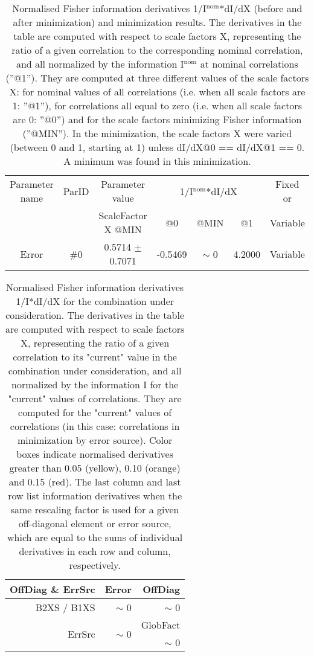 \begin{table}[H]
\scriptsize
\begin{center}
\renewcommand{\arraystretch}{1.1}
\begin{tabular}{|c|c|c|ccc|c|}
\hline
Parameter name & ParID & Parameter value &\multicolumn{3}{|c|}{1/I$^\mathrm{nom}$*dI/dX} & Fixed or\\
 & & ScaleFactor X @MIN & @0 & @MIN & @1 & Variable\\
\hline
 {\tiny Error} & \#0 &    0.5714 $\pm$    0.7071 &   -0.5469 & {\tiny $\sim$ }0 &    4.2000 & Variable \\
\hline
\end{tabular}
\renewcommand{\arraystretch}{1}
\caption{Normalised Fisher information derivatives 1/I$^\mathrm{nom}$*dI/dX (before and after minimization) and minimization results.  The derivatives in the table are computed with respect to scale factors X, representing the ratio of a given correlation to the corresponding nominal correlation, and all normalized by the information I$^\mathrm{nom}$ at nominal correlations (''@1''). They are computed at three different values of the scale factors X: for nominal values of all correlations (i.e. when all scale factors are 1: ''@1''), for correlations all equal to zero (i.e. when all scale factors are 0: ''@0'') and for the scale factors minimizing Fisher information (''@MIN''). In the minimization, the scale factors X were varied (between 0 and 1, starting at 1) unless dI/dX@0 == dI/dX@1 == 0. A minimum was found in this minimization.}
\end{center}
\end{table}
\begin{table}[H]
\scriptsize
\begin{center}
\renewcommand{\arraystretch}{1.1}
\begin{tabular}{|r|r|r|}
\hline
 OffDiag \& ErrSrc & {\tiny Error} & OffDiag\\
\hline
B2XS / B1XS &  {\tiny $\sim$ }0 &  {\tiny $\sim$ }0 \\
\hline
\multirow{2}{*}{ErrSrc} & \multirow{2}{*}{ {\tiny $\sim$ }0} & GlobFact\\
 & &  {\tiny $\sim$ }0 \\
\hline
\end{tabular}
\renewcommand{\arraystretch}{1}
\caption{Normalised Fisher information derivatives 1/I*dI/dX for the combination under consideration. The derivatives in the table are computed with respect to scale factors X, representing the ratio of a given correlation to its "current" value in the combination under consideration, and all normalized by the information I for the "current" values of correlations. They are computed for the "current" values of correlations (in this case: correlations in minimization by error source). Color boxes indicate normalised derivatives greater than 0.05 (yellow), 0.10 (orange) and 0.15 (red). The last column and last row list information derivatives when the same rescaling factor is used for a given off-diagonal element or error source, which are equal to the sums of individual derivatives in each row and column, respectively.}
\end{center}
\end{table}
